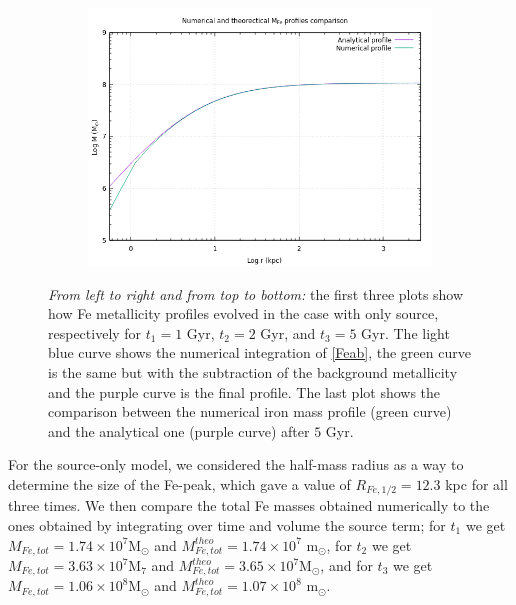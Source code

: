 \documentclass{article}
\begin{document}
\begin{figure}[H]
\begin{subfigure}{0.49\textwidth}
	\end{subfigure}
	\begin{subfigure}{0.49\textwidth}
		\includegraphics[width=0.9\linewidth]{femass_comparison.png}
	\end{subfigure}
	\caption{\textit{From left to right and from top to bottom:} the first three plots show how Fe metallicity profiles evolved in the case with only source, respectively for $t_{1}=1 $ Gyr, $t_{2}=2$ Gyr, and $t_{3}=5$ Gyr. The light blue curve shows the numerical integration of \eqref{Feab}, the green curve is the same but with the subtraction of the background metallicity and the purple curve is the final profile.
	The last plot shows the comparison between the numerical iron mass profile (green curve) and the analytical one (purple curve) after $5$ Gyr.}
	\label{fig:Zsourceonly}
\end{figure}
For the source-only model, we considered the half-mass radius as a way to determine the size of the Fe-peak, which gave a value of $R_{Fe,1/2}=12.3$ kpc for all three times. We then compare the total Fe masses obtained numerically to the ones obtained by integrating over time and volume the source term; for $t_{1}$ we get $M_{Fe,tot}=1.74\times10^{7}$M$_{\odot}$ and $M_{Fe,tot}^{theo}=1.74\times10^{7}$ m$_{\odot}$, for $t_{2}$ we get $M_{Fe,tot}=3.63\times10^{7}$M$_{7}$ and $M_{Fe,tot}^{theo}=3.65\times 10^{7}$M$_{\odot}$, and for $t_{3}$ we get $M_{Fe,tot}=1.06\times10^{8}$M$_{\odot}$ and $M_{Fe,tot}^{theo}=1.07\times10^{8}$ m$_{\odot}$.
\end{document}
